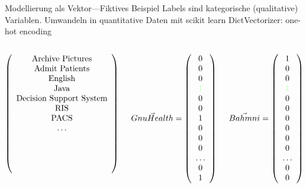 \documentclass[aspectratio=1610,handout]{beamer}
\newcommand{\both}[1]{{\color[rgb]{0.8,1,0.8}\textbf{#1}}}
\begin{document}
\begin{frame}{Modellierung als Vektor---Fiktives Beispiel}
Labels sind kategorische (qualitative) Variablen. Umwandeln in quantitative Daten mit scikit learn DictVectorizer: one-hot encoding
\begin{columns}
 
 \begin{column}{.4\textwidth}
   \[\left(\begin{array}{c} \textnormal{Archive Pictures} \\ \textnormal{Admit Patients} \\ \textnormal{English} \\ \textnormal{Java} \\ \textnormal{Decision Support System} \\ \textnormal{RIS} \\ \textnormal{PACS} \\ \dots \\ \\ \\ \\ \\ \end{array}\right) \]
 \end{column}
 
 \begin{column}{.25\textwidth}
   \[\vec{GnuHealth}	= \left(\begin{array}{c} 0 \\ 0 \\ 0 \\ \both{1} \\ 0 \\ 0 \\ 1 \\ 0 \\ 0 \\ 0 \\ \ldots \\ 0 \\ 1 \end{array}\right) \]
 \end{column}

 \begin{column}{.25\textwidth}
   \[\vec{Bahmni}		= \left(\begin{array}{c} 1 \\ 0 \\ 0 \\ \both{1} \\ 0 \\ 0 \\ 0 \\ 0 \\ 0 \\ 0 \\ \ldots \\ 0 \\ 0 \end{array}\right) \]
 \end{column}
\end{columns}

\end{frame}
\end{document}
